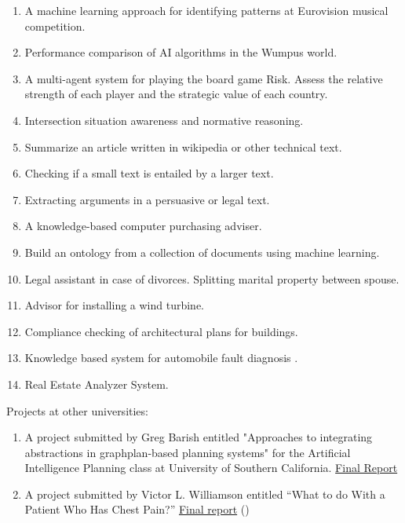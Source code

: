 \documentclass[a4paper,12pt]{report}
\begin{document}
\begin{enumerate}
 \item A machine learning approach for identifying patterns at Eurovision musical competition. 
\item Performance comparison of AI algorithms in the Wumpus world.
\item A multi-agent system for playing the board game Risk. Assess the
relative strength of each player and the strategic value of each country. 
\item Intersection situation awareness and normative reasoning.
\item Summarize an article written in wikipedia or other technical text.
\item Checking if a small text is entailed by a larger text.
\item Extracting arguments in a persuasive or legal text.
\item A knowledge-based computer purchasing adviser.
\item Build an ontology from a collection of documents using machine learning.
\item Legal assistant in case of divorces. Splitting marital property between spouse.
\item Advisor for installing a wind turbine.
\item Compliance checking of architectural plans for buildings.
\item Knowledge based system for automobile fault diagnosis .
\item Real Estate Analyzer System. 
 
\end{enumerate}

 



Projects at other universities:
\begin{enumerate}
 \item A project submitted by Greg Barish entitled "Approaches to integrating abstractions in graphplan-based planning systems" for the Artificial Intelligence Planning class at University of Southern California.
\href{http://www.isi.edu/~blythe/cs541/Projects/barish.pdf}{Final Report}
\item A project submitted by Victor L. Williamson entitled ``What to do With a Patient Who Has
Chest Pain?'' \href{http://ocw.mit.edu/courses/electrical-engineering-and-computer-science/6-871-knowledge-based-applications-systems-spring-2005/projects/william_cp_ches.pdf}{Final report}
()

\end{enumerate}
\end{document}
